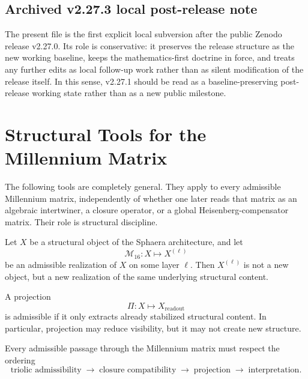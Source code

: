 \subsection*{Archived v2.27.3 local post-release note}
The present file is the first explicit local subversion after the public Zenodo release v2.27.0. Its role is conservative: it preserves the release structure as the new working baseline, keeps the mathematics-first doctrine in force, and treats any further edits as local follow-up work rather than as silent modification of the release itself. In this sense, v2.27.1 should be read as a baseline-preserving post-release working state rather than as a new public milestone.

\appendix

\section{Structural Tools for the Millennium Matrix}
\label{app:mm-tools}

\begin{remark}
The following tools are completely general. They apply to every admissible
Millennium matrix, independently of whether one later reads that matrix as an
algebraic intertwiner, a closure operator, or a global Heisenberg-compensator
matrix. Their role is structural discipline.
\end{remark}

\begin{definition}
Let $X$ be a structural object of the Sphaera architecture, and let
\[
\mathcal M_{16}: X \mapsto X^{(\ell)}
\]
be an admissible realization of $X$ on some layer $\ell$. Then $X^{(\ell)}$
is not a new object, but a new realization of the same underlying structural
content.
\end{definition}

\begin{definition}
A projection
\[
\Pi: X \mapsto X_{\mathrm{readout}}
\]
is admissible if it only extracts already stabilized structural content. In
particular, projection may reduce visibility, but it may not create new
structure.
\end{definition}

\begin{definition}
Every admissible passage through the Millennium matrix must respect the
ordering
\[
\text{triolic admissibility}
\;\longrightarrow\;
\text{closure compatibility}
\;\longrightarrow\;
\text{projection}
\;\longrightarrow\;
\text{interpretation}.
\]
\end{definition}

